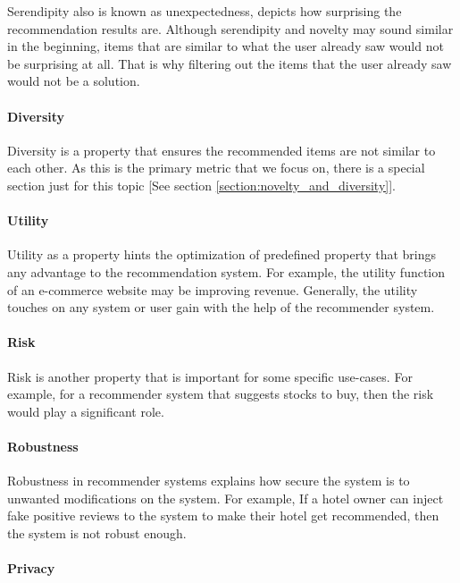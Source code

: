 Serendipity also is known as unexpectedness, depicts how surprising the recommendation results are. Although serendipity and novelty may sound similar in the beginning, items that are similar to what the user already saw would not be surprising at all. That is why filtering out the items that the user already saw would not be a solution.

\paragraph{Diversity}

Diversity is a property that ensures the recommended items are not similar to each other. As this is the primary metric that we focus on, there is a special section just for this topic [See section \ref{section:novelty_and_diversity}].


\paragraph{Utility}

Utility as a property hints the optimization of predefined property that brings any advantage to the recommendation system. For example, the utility function of an e-commerce website may be improving revenue. Generally, the utility touches on any system or user gain with the help of the recommender system.

\paragraph{Risk}

Risk is another property that is important for some specific use-cases. For example, for a recommender system that suggests stocks to buy, then the risk would play a significant role.

\paragraph{Robustness}

Robustness in recommender systems explains how secure the system is to unwanted modifications on the system. For example, If a hotel owner can inject fake positive reviews to the system to make their hotel get recommended, then the system is not robust enough.

\paragraph{Privacy}

